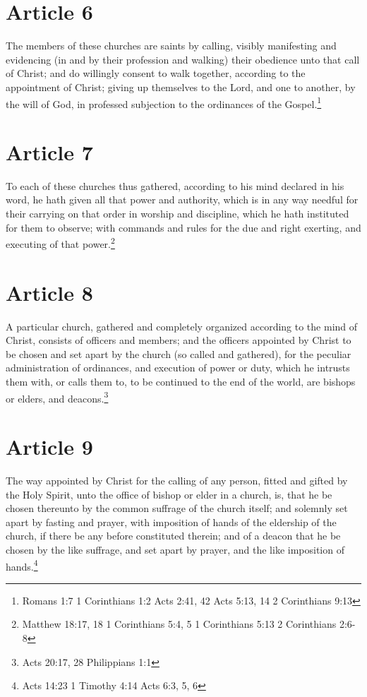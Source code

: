 \documentclass[12pt,letterpaper]{book}
\begin{document}
\section{Article 6}

The members of these churches are saints by calling, visibly manifesting and evidencing (in and by their profession and walking) their obedience unto that call of Christ; and do willingly consent to walk together, according to the appointment of Christ; giving up themselves to the Lord, and one to another, by the will of God, in professed subjection to the ordinances of the Gospel.\footnote{Romans 1:7 1 Corinthians 1:2 Acts 2:41, 42 Acts 5:13, 14 2 Corinthians 9:13}

\section{Article 7}

To each of these churches thus gathered, according to his mind declared in his word, he hath given all that power and authority, which is in any way needful for their carrying on that order in worship and discipline, which he hath instituted for them to observe; with commands and rules for the due and right exerting, and executing of that power.\footnote{Matthew 18:17, 18 1 Corinthians 5:4, 5 1 Corinthians 5:13 2 Corinthians 2:6-8}

\section{Article 8}

A particular church, gathered and completely organized according to the mind of Christ, consists of officers and members; and the officers appointed by Christ to be chosen and set apart by the church (so called and gathered), for the peculiar administration of ordinances, and execution of power or duty, which he intrusts them with, or calls them to, to be continued to the end of the world, are bishops or elders, and deacons.\footnote{Acts 20:17, 28 Philippians 1:1}

\section{Article 9}

The way appointed by Christ for the calling of any person, fitted and gifted by the Holy Spirit, unto the office of bishop or elder in a church, is, that he be chosen thereunto by the common suffrage of the church itself; and solemnly set apart by fasting and prayer, with imposition of hands of the eldership of the church, if there be any before constituted therein; and of a deacon that he be chosen by the like suffrage, and set apart by prayer, and the like imposition of hands.\footnote{Acts 14:23 1 Timothy 4:14 Acts 6:3, 5, 6}
\end{document}
